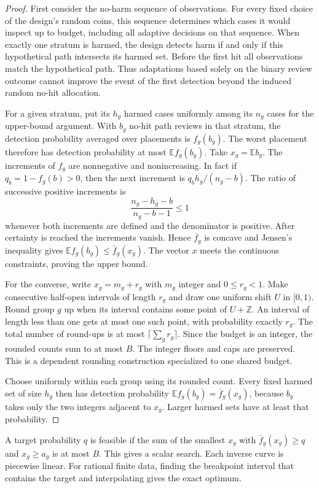 \documentclass[11pt]{article}
\begin{document}
\begin{proof}
First consider the no-harm sequence of observations. For every
fixed choice of the design's random coins, this sequence determines
which cases it would inspect up to budget, including all adaptive
decisions on that sequence. When exactly one stratum is harmed,
the design detects harm if and only if this hypothetical path
intersects its harmed set. Before the first hit all observations
match the hypothetical path. Thus adaptations based solely on
the binary review outcome cannot improve the event of the first
detection beyond the induced random no-hit allocation.

For a given stratum, put its $h_g$ harmed cases uniformly among
its $n_g$ cases for the upper-bound argument. With $b_g$ no-hit
path reviews in that stratum, the detection probability averaged
over placements is $f_g(b_g)$. The worst placement therefore
has detection probability at most $\mathbb E f_g(b_g)$.
Take $x_g=\mathbb E b_g$. The increments of $f_g$ are
nonnegative and nonincreasing. In fact if $q_b=1-f_g(b)>0$,
then the next increment is $q_bh_g/(n_g-b)$.
The ratio of successive positive increments is
\[
\frac{n_g-h_g-b}{n_g-b-1}\le1
\]
whenever both increments are defined and the denominator is
positive. After certainty is reached the increments vanish.
Hence $\bar f_g$ is concave and Jensen's inequality gives
$\mathbb E f_g(b_g)\le\bar f_g(x_g)$. The vector $x$ meets
the continuous constraints, proving the upper bound.

For the converse, write $x_g=m_g+r_g$ with $m_g$ integer
and $0\le r_g<1$. Make consecutive half-open intervals of
length $r_g$ and draw one uniform shift $U$ in $[0,1)$.
Round group $g$ up when its interval contains some point
of $U+\mathbb Z$. An interval of length less than one gets
at most one such point, with probability exactly $r_g$.
The total number of round-ups is at most
$\lceil\sum_g r_g\rceil$. Since the budget is an integer,
the rounded counts sum to at most $B$. The integer floors
and caps are preserved. This is a dependent rounding
construction \cite{gandhi} specialized to one shared budget.

Choose uniformly within each group using its rounded count.
Every fixed harmed set of size $h_g$ then has detection
probability $\mathbb E f_g(b_g)=\bar f_g(x_g)$, because
$b_g$ takes only the two integers adjacent to $x_g$.
Larger harmed sets have at least that probability.
\end{proof}

A target probability $q$ is feasible if the sum of the smallest
$x_g$ with $\bar f_g(x_g)\ge q$ and $x_g\ge a_g$ is at most $B$.
This gives a scalar search. Each inverse curve is piecewise
linear. For rational finite data, finding the breakpoint interval
that contains the target and interpolating gives the exact
optimum.
\end{document}
